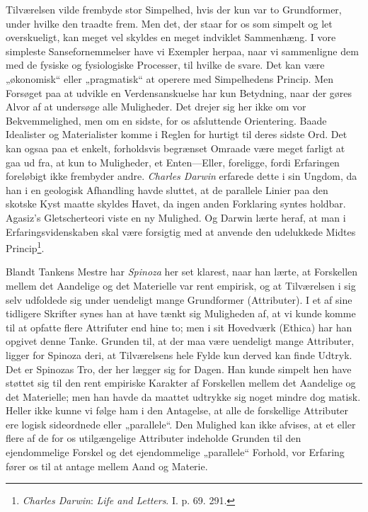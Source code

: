 \documentclass[12pt,a4paper]{book}
\newcommand{\opage}[1]{\marginnote{\footnotesize\textit{[#1]}}}
\newcommand{\apage}[1]{\marginnote{\footnotesize\textit{[#1]}}}
\begin{document}
Tilværelsen vilde frembyde stor Simpelhed, hvis der kun \apage{337} var to Grundformer, under hvilke
den traadte frem. Men det, der staar for os som simpelt og let overskueligt, kan meget vel
skyldes en meget indviklet Sammenhæng. I vore simpleste Sansefornemmelser have vi Exempler
herpaa, naar vi sammenligne dem med de fysiske og fysiologiske Processer, til hvilke de
svare. Det kan være „økonomisk“ eller „pragmatisk“ at operere med Simpelhedens Princip. Men
Forsøget paa at udvikle en Verdensanskuelse har kun Betydning, naar der gøres Alvor af at
undersøge alle Muligheder. Det drejer sig her ikke om vor Bekvemmelighed, men om en sidste,
for os afsluttende Orientering. Baade Idealister og Materialister komme i Reglen for
hurtigt til deres sidste Ord. Det kan ogsaa paa et enkelt, forholdsvis begrænset Omraade
være meget farligt at gaa ud fra, at kun to Muligheder, et Enten---Eller, foreligge, fordi
Erfaringen foreløbigt ikke frembyder andre. \emph{Charles Darwin} erfarede dette i sin
Ungdom, da han i en geologisk Afhandling havde sluttet, at de parallele Linier paa den
skotske Kyst maatte skyldes Havet, da ingen anden Forklaring syntes holdbar. Agasiz's
Gletscherteori viste en ny Mulighed. Og Darwin lærte heraf, at man i Erfaringsvidenskaben
skal være forsigtig med at anvende den udelukkede Midtes Princip\footnote{\emph{Charles
Darwin}: \emph{Life and Letters}. I. p. 69. 291.}.

Blandt Tankens Mestre har \emph{Spinoza} her set klarest, naar han lærte, at Forskellen
mellem det Aandelige og det Materielle var rent empirisk, og at Tilværelsen i sig selv
udfoldede sig under uendeligt mange Grundformer (Attributer). I et af sine tidligere
Skrifter synes han at have tænkt sig Muligheden af, at vi kunde komme til at opfatte flere Attrifuter end hine to; men i sit Hovedværk (Ethica) har han opgivet denne Tanke. Grunden
til, at der maa være uendeligt mange Attributer, ligger for Spinoza deri, at Tilværelsens
hele Fylde kun derved kan finde Udtryk. Det er Spinozas Tro, der her lægger sig for Dagen.
Han kunde simpelt hen have støttet sig til den rent empiriske Karakter af Forskellen mellem
det Aandelige og det Materielle; men han havde da maattet udtrykke sig noget mindre
dog%
\opage{338}matisk. Heller ikke kunne vi følge ham i den Antagelse, at alle de forskellige
Attributer ere logisk sideordnede eller „parallele“. Den Mulighed kan ikke afvises, at et
eller flere af de for os utilgængelige Attributer indeholde Grunden til den ejendommelige
Forskel og det ejendommelige „parallele“ Forhold, vor Erfaring fører os til at antage
mellem Aand og Materie.
\end{document}
